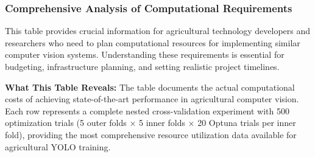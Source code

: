 \begin{table}[H]
\centering
\caption{Actual Computational Requirements (50 Epochs)}
\label{tab:computational_requirements_50}
\end{table}

\subsubsection{Comprehensive Analysis of Computational Requirements}

This table provides crucial information for agricultural technology developers and researchers who need to plan computational resources for implementing similar computer vision systems. Understanding these requirements is essential for budgeting, infrastructure planning, and setting realistic project timelines.

\textbf{What This Table Reveals:} The table documents the actual computational costs of achieving state-of-the-art performance in agricultural computer vision. Each row represents a complete nested cross-validation experiment with 500 optimization trials (5 outer folds × 5 inner folds × 20 Optuna trials per inner fold), providing the most comprehensive resource utilization data available for agricultural YOLO training.

